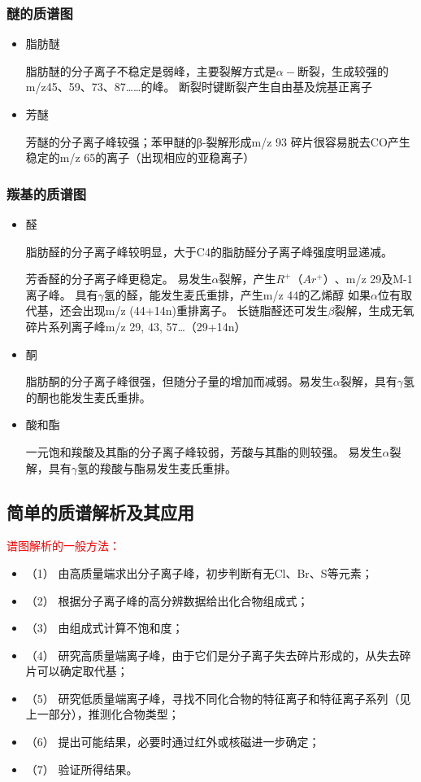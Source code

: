 \subsubsection*{醚的质谱图}
\begin{itemize}
    \item 脂肪醚
    
    脂肪醚的分子离子不稳定是弱峰，主要裂解方式是$\alpha -$断裂，生成较强的m/z45、59、73、87……的峰。
    断裂时键断裂产生自由基及烷基正离子
    \item 芳醚
    
    芳醚的分子离子峰较强；苯甲醚的β-裂解形成m/z 93 碎片很容易脱去CO产生稳定的m/z 65的离子（出现相应的亚稳离子）
\end{itemize}
\subsubsection*{羰基的质谱图}
\begin{itemize}
    \item  醛
    
    脂肪醛的分子离子峰较明显，大于C4的脂肪醛分子离子峰强度明显递减。
    
    芳香醛的分子离子峰更稳定。
    易发生$\alpha$裂解，产生$R^{+}（Ar^{+}）$、m/z 29及M-1离子峰。
    具有$\gamma$氢的醛，能发生麦氏重排，产生m/z 44的乙烯醇
    如果$\alpha$位有取代基，还会出现m/z (44+14n)重排离子。
    长链脂醛还可发生$\beta$裂解，生成无氧碎片系列离子峰m/z 29, 43, 57…（29+14n）
    \item  酮
    
    脂肪酮的分子离子峰很强，但随分子量的增加而减弱。易发生$\alpha$裂解，具有$\gamma$氢的酮也能发生麦氏重排。
    \item 酸和酯
    
    一元饱和羧酸及其酯的分子离子峰较弱，芳酸与其酯的则较强。
    易发生$\alpha$裂解，具有$\gamma$氢的羧酸与酯易发生麦氏重排。
\end{itemize}

\subsection{简单的质谱解析及其应用}
\begin{note}
    

\textcolor{red}{谱图解析的一般方法：}
\begin{itemize}
    \item（1） 由高质量端求出分子离子峰，初步判断有无Cl、Br、S等元素；
    \item（2） 根据分子离子峰的高分辨数据给出化合物组成式；
    \item（3） 由组成式计算不饱和度；
    \item（4） 研究高质量端离子峰，由于它们是分子离子失去碎片形成的，从失去碎片可以确定取代基；
    \item（5） 研究低质量端离子峰，寻找不同化合物的特征离子和特征离子系列（见上一部分），推测化合物类型；
    \item（6） 提出可能结果，必要时通过红外或核磁进一步确定；
    \item（7） 验证所得结果。
\end{itemize}
\end{note}


